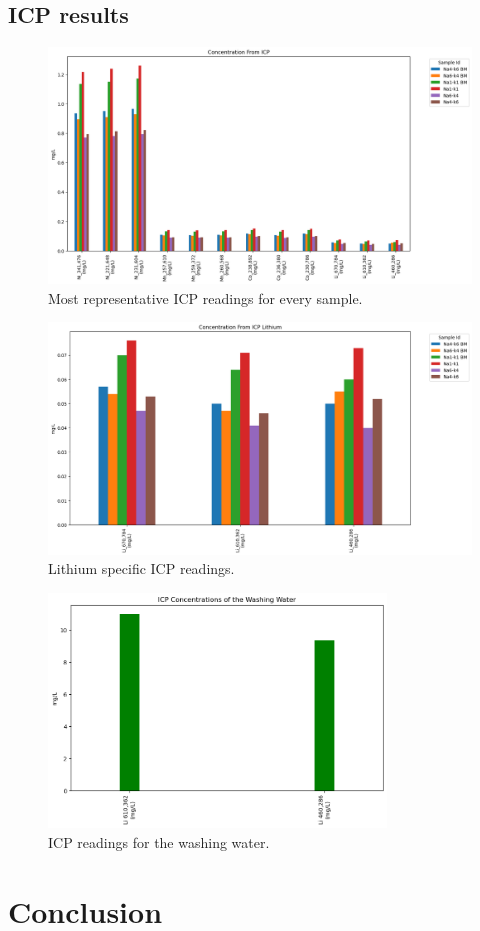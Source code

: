 \documentclass{article}
\begin{document}
\subsection{ICP results}
\begin{figure}[H]
  \centering
  \includegraphics[width=\textwidth]{output.png}
  \caption{Most representative ICP readings for every sample.}
  \label{fig:example_image}
\end{figure}
\begin{figure}[H]
  \centering
  \includegraphics[width=\textwidth]{output3.png}
  \caption{Lithium specific ICP readings.}
  \label{fig:example_image}
\end{figure}
\begin{figure}[H]
  \centering
  \includegraphics[width=0.8\textwidth]{output2.png}
  \caption{ICP readings for the washing water.}
  \label{fig:example_image}
\end{figure}
\section{Conclusion}


\newpage
\listoffigures
  

\end{document}
